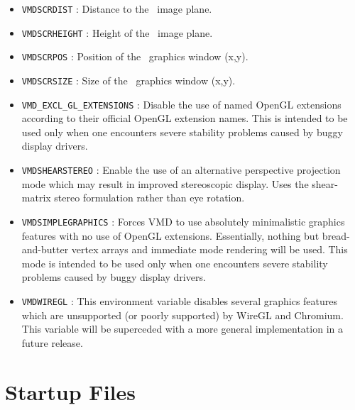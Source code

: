 \begin{itemize}
  \item {\tt VMDSCRDIST} :
   Distance to the \VMD\ image plane.

  \item {\tt VMDSCRHEIGHT} :
   Height of the \VMD\ image plane.

  \item {\tt VMDSCRPOS} :
   Position of the \VMD\ graphics window (x,y).

  \item {\tt VMDSCRSIZE} :
   Size of the \VMD\ graphics window (x,y).

  \item {\tt VMD\_EXCL\_GL\_EXTENSIONS} :
  Disable the use of named OpenGL extensions according to their
  official OpenGL extension names.  This is intended to be used 
  only when one encounters severe stability problems caused by 
  buggy display drivers.


  \item {\tt VMDSHEARSTEREO} :
   Enable the use of an alternative perspective projection mode 
   which may result in improved stereoscopic display.  Uses the
   shear-matrix stereo formulation rather than eye rotation.


  \item {\tt VMDSIMPLEGRAPHICS} :
   Forces VMD to use absolutely minimalistic graphics features with no 
   use of OpenGL extensions.  Essentially, nothing but bread-and-butter 
   vertex arrays and immediate mode rendering will be used.  This mode
   is intended to be used only when one encounters severe stability 
   problems caused by buggy display drivers.

\item {\tt VMDWIREGL} :
   This environment variable disables several graphics features which
   are unsupported (or poorly supported) by WireGL and Chromium.
   This variable will be superceded with a more general
   implementation in a future release.

\end{itemize}

\section{Startup Files}
